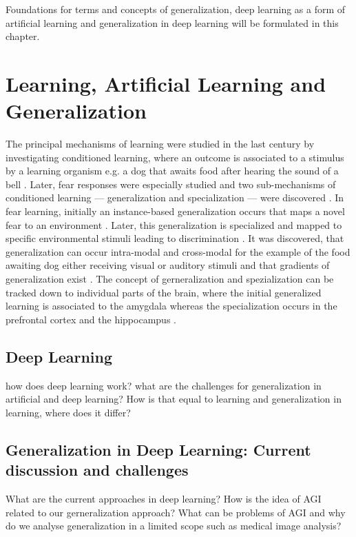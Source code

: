 Foundations for terms and concepts of generalization, deep learning as a form of artificial learning and generalization in deep learning will be formulated in this chapter.

\section{Learning, Artificial Learning and Generalization}

    The principal mechanisms of learning were studied in the last century by investigating conditioned learning, where an outcome is associated to a stimulus by a learning organism e.g. a dog that awaits food after hearing the sound of a bell \citep{pavlov1928conditioned, pavlov2010conditioned, banich2011generalization}. Later, fear responses were especially studied and two sub-mechanisms of conditioned learning --- generalization and specialization --- were discovered \citep{banich2011generalization}.
    In fear learning, initially an instance-based generalization occurs that maps a novel fear to an environment \citep{banich2011generalization}. Later, this generalization is specialized and mapped to specific environmental stimuli leading to discrimination \citep{banich2011generalization}.
    It was discovered, that generalization can occur intra-modal and cross-modal for the example of the food awaiting dog either receiving visual or auditory stimuli \citep{pavlov1928conditioned} and that gradients of generalization exist \citep{guttman1956discriminability}.
    The concept of gerneralization and spezialization can be tracked down to individual parts of the brain, where the initial generalized learning is associated to the amygdala whereas the specialization occurs in the prefrontal cortex and the hippocampus \citep{banich2011generalization}.

    \subsection{Deep Learning}
        how does deep learning work?
        what are the challenges for generalization in artificial and deep learning?
        How is that equal to learning and generalization in learning, where does it differ?

    \subsection{Generalization in Deep Learning: Current discussion and challenges}
        What are the current approaches in deep learning? How is the idea of AGI related to our gerneralization approach? What can be problems of AGI and why do we analyse generalization in a limited scope such as medical image analysis?



